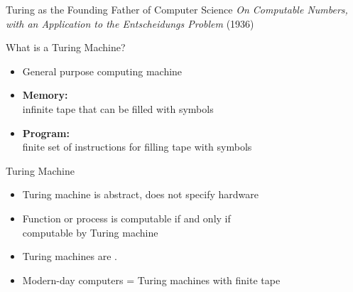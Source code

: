 \documentclass[xcolor={usenames,svgnames,x11names,dvipsnames,table}]{beamer}
\begin{document}
\begin{frame}{Turing as the Founding Father of Computer Science}
    \emph{On Computable Numbers, with an Application to the Entscheidungs Problem} (1936)

    \begin{block}{What is a Turing Machine?}
        \begin{itemize}
            \item General purpose computing machine
            \item \textbf{Memory:}\\
                    infinite tape that can be filled with symbols
            \item \textbf{Program:}\\
                    finite set of instructions for filling tape with symbols
        \end{itemize}
    \end{block}
\end{frame}

\begin{frame}{Turing Machine}
    \begin{itemize}
        \item Turing machine is abstract, does not specify hardware\\
        \item Function or process is computable if and only if\\ computable by Turing machine
        \item Turing machines are .
        \item Modern-day computers = Turing machines with finite tape
    \end{itemize}
\end{frame}
\end{document}
